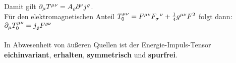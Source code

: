 Damit gilt $\partial_{\mu}T^{\mu\nu} = A_{\varrho}\partial^{\nu}j^{\varrho}$. \\
Für den elektromagnetischen Anteil $T^{\mu\nu}_0 = F^{\mu \nu} F_{\sigma}^{\phantom{\sigma}\nu} + \frac{1}{4}g^{\mu\nu}F^2$ folgt dann: 
$\partial_{\mu}T^{\mu\nu}_0=j_{\varrho}F^{\varrho\nu}$ \\
\vspace{1pt} \\
In Abwesenheit von äußeren Quellen ist der Energie-Impuls-Tensor \textbf{eichinvariant}, \textbf{erhalten}, \textbf{symmetrisch} und \textbf{spurfrei}.
